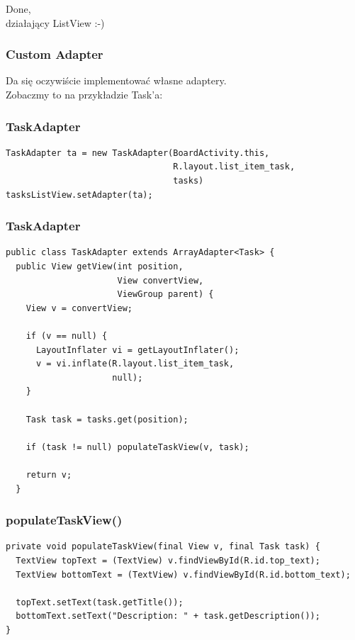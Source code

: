 \documentclass{beamer}
\begin{document}
\begin{frame}
 \begin{center}
  Done, \\ 
  działający ListView :-)
 \end{center}
\end{frame}

\begin{frame}\frametitle{Custom Adapter}
 \begin{center}
  \large{Da się oczywiście implementować własne adaptery.\\
  Zobaczmy to na przykładzie Task'a:}
 \end{center}
\end{frame}

\begin{frame}[fragile]\frametitle{TaskAdapter}
\begin{lstlisting}
TaskAdapter ta = new TaskAdapter(BoardActivity.this, 
                                 R.layout.list_item_task, 
                                 tasks)
tasksListView.setAdapter(ta);
\end{lstlisting}
\end{frame}


\begin{frame}[fragile]\frametitle{TaskAdapter}
\begin{lstlisting}
public class TaskAdapter extends ArrayAdapter<Task> {
  public View getView(int position, 
                      View convertView, 
                      ViewGroup parent) {
    View v = convertView;

    if (v == null) {
      LayoutInflater vi = getLayoutInflater();
      v = vi.inflate(R.layout.list_item_task, 
                     null);
    }

    Task task = tasks.get(position);

    if (task != null) populateTaskView(v, task);

    return v;
  }
\end{lstlisting}
\end{frame}

\begin{frame}[fragile]\frametitle{populateTaskView()}
\begin{lstlisting}
private void populateTaskView(final View v, final Task task) {
  TextView topText = (TextView) v.findViewById(R.id.top_text);
  TextView bottomText = (TextView) v.findViewById(R.id.bottom_text);

  topText.setText(task.getTitle());
  bottomText.setText("Description: " + task.getDescription());
}
\end{lstlisting}

\end{frame}
\end{document}
